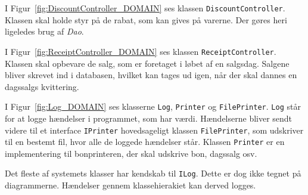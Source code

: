 
I Figur~\ref{fig:DiscountController_DOMAIN} ses klassen \texttt{DiscountController}. Klassen skal holde styr på de rabat, som kan gives på varerne. Der gøres heri ligeledes brug af \textit{Dao}.


I Figur~\ref{fig:ReceiptController_DOMAIN} ses klassen \texttt{ReceiptController}. Klassen skal opbevare de salg, som er foretaget i løbet af en salgsdag. Salgene bliver skrevet ind i databasen, hvilket kan tages ud igen, når der skal dannes en dagssalgs kvittering.


I Figur~\ref{fig:Log_DOMAIN} ses klasserne \texttt{Log}, \texttt{Printer} og \texttt{FilePrinter}. \texttt{Log} står for at logge hændelser i programmet, som har værdi. Hændelserne bliver sendt videre til et interface \texttt{IPrinter} hovedsageligt klassen \texttt{FilePrinter}, som udskriver til en bestemt fil, hvor alle de loggede hændelser står. Klassen \texttt{Printer} er en implementering til bonprinteren, der skal udskrive bon, dagssalg osv.


Det fleste af systemets klasser har kendskab til \texttt{ILog}. Dette er dog ikke tegnet på diagrammerne. Hændelser gennem klassehierakiet kan derved logges.